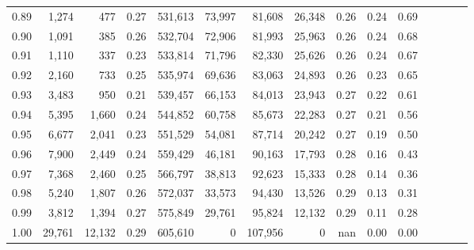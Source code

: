 \begin{tabular}{rrrcrrrrrrrrrrr}
0.89 &   1,274 &     477 &                                       0.27 &  531,613 &   73,997 &   81,608 &   26,348 &  0.26 &  0.24 &                         0.69 \\
0.90 &   1,091 &     385 &                                       0.26 &  532,704 &   72,906 &   81,993 &   25,963 &  0.26 &  0.24 &                         0.68 \\
0.91 &   1,110 &     337 &                                       0.23 &  533,814 &   71,796 &   82,330 &   25,626 &  0.26 &  0.24 &                         0.67 \\
0.92 &   2,160 &     733 &                                       0.25 &  535,974 &   69,636 &   83,063 &   24,893 &  0.26 &  0.23 &                         0.65 \\
0.93 &   3,483 &     950 &                                       0.21 &  539,457 &   66,153 &   84,013 &   23,943 &  0.27 &  0.22 &                         0.61 \\
0.94 &   5,395 &   1,660 &                                       0.24 &  544,852 &   60,758 &   85,673 &   22,283 &  0.27 &  0.21 &                         0.56 \\
0.95 &   6,677 &   2,041 &                                       0.23 &  551,529 &   54,081 &   87,714 &   20,242 &  0.27 &  0.19 &                         0.50 \\
0.96 &   7,900 &   2,449 &                                       0.24 &  559,429 &   46,181 &   90,163 &   17,793 &  0.28 &  0.16 &                         0.43 \\
0.97 &   7,368 &   2,460 &                                       0.25 &  566,797 &   38,813 &   92,623 &   15,333 &  0.28 &  0.14 &                         0.36 \\
0.98 &   5,240 &   1,807 &                                       0.26 &  572,037 &   33,573 &   94,430 &   13,526 &  0.29 &  0.13 &                         0.31 \\
0.99 &   3,812 &   1,394 &                                       0.27 &  575,849 &   29,761 &   95,824 &   12,132 &  0.29 &  0.11 &                         0.28 \\
1.00 &  29,761 &  12,132 &                                       0.29 &  605,610 &        0 &  107,956 &        0 &   nan &  0.00 &                         0.00 \\
\bottomrule
\end{tabular}
